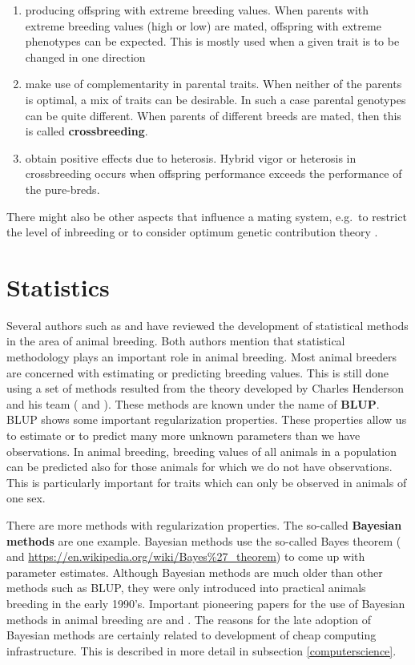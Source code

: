 \documentclass[
]{book}
\providecommand{\tightlist}{%
  \setlength{\itemsep}{0pt}\setlength{\parskip}{0pt}}
\begin{document}
\begin{enumerate}
\def\labelenumi{\arabic{enumi}.}
\tightlist
\item
  producing offspring with extreme breeding values. When parents with extreme breeding values (high or low) are mated, offspring with extreme phenotypes can be expected. This is mostly used when a given trait is to be changed in one direction
\item
  make use of complementarity in parental traits. When neither of the parents is optimal, a mix of traits can be desirable. In such a case parental genotypes can be quite different. When parents of different breeds are mated, then this is called \textbf{crossbreeding}.
\item
  obtain positive effects due to heterosis. Hybrid vigor or heterosis in crossbreeding occurs when offspring performance exceeds the performance of the pure-breds.
\end{enumerate}

There might also be other aspects that influence a mating system, e.g.~to restrict the level of inbreeding or to consider optimum genetic contribution theory \citep{Meuwissen1997}.

\hypertarget{statistics}{%
\section{Statistics}\label{statistics}}

Several authors such as \citep{Schaeffer2013} and \citep{Gianola2015} have reviewed the development of statistical methods in the area of animal breeding. Both authors mention that statistical methodology plays an important role in animal breeding. Most animal breeders are concerned with estimating or predicting breeding values. This is still done using a set of methods resulted from the theory developed by Charles Henderson and his team (\citep{Henderson1953} and \citep{Henderson1975}). These methods are known under the name of \textbf{BLUP}. BLUP shows some important regularization properties. These properties allow us to estimate or to predict many more unknown parameters than we have observations. In animal breeding, breeding values of all animals in a population can be predicted also for those animals for which we do not have observations. This is particularly important for traits which can only be observed in animals of one sex.

There are more methods with regularization properties. The so-called \textbf{Bayesian methods} are one example. Bayesian methods use the so-called Bayes theorem (\citep{Bayes1763} and \url{https://en.wikipedia.org/wiki/Bayes\%27_theorem}) to come up with parameter estimates. Although Bayesian methods are much older than other methods such as BLUP, they were only introduced into practical animals breeding in the early 1990's. Important pioneering papers for the use of Bayesian methods in animal breeding are \citep{Gianola1982} and \citep{Gianola1986}. The reasons for the late adoption of Bayesian methods are certainly related to development of cheap computing infrastructure. This is described in more detail in subsection \ref{computerscience}.
\end{document}
